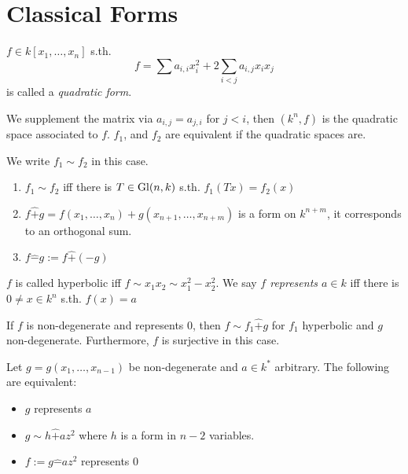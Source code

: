 \section{Classical Forms}
\begin{definition}
  $f\in k[x_1, \ldots, x_n]$ s.th.
  $$f = \sum a_{i,i}x_i^2 + 2\sum_{i<j}a_{i,j}x_ix_j$$
  is called a {\em quadratic form}.

  We supplement the matrix via $a_{i,j} = a_{j,i}$ for $j<i$, then
  $(k^n, f)$ is the quadratic space associated to $f$. $f_1$, and $f_2$
  are equivalent if the quadratic spaces are.

  We write $f_1\sim f_2$ in this case.
\end{definition}

\begin{remark}
   \begin{enumerate}
     \item $f_1 \sim f_2$ iff there is $T\in \mathop{\rm Gl}\nolimits(n, k)$ s.th. $f_1(T x) = f_2(x)$
     \item $f \hat + g = f(x_1, \ldots, x_n) + g(x_{n+1}, \ldots, x_{n+m})$ is
       a form on $k^{n+m}$, it corresponds to an orthogonal sum.
     \item $f \hat - g := f\hat +(-g)$
   \end{enumerate}
\end{remark}

\begin{definition}
  $f$ is called hyperbolic iff $f\sim x_1x_2 \sim x_1^2-x_2^2$.
  We say {\em $f$ represents $a\in k$} iff there is $0\ne x\in k^n$ s.th.
  $f(x) = a$
\end{definition}

\begin{proposition}
  If $f$ is non-degenerate and represents $0$, then $f\sim f_1 \hat + g$
  for $f_1$ hyperbolic and $g$ non-degenerate. Furthermore, $f$ is surjective
  in this case.
\end{proposition}

\begin{korollar}
  Let $g = g(x_1, \ldots, x_{n-1})$ be non-degenerate and $a\in k^*$ arbitrary.
  The following are equivalent:
  \begin{itemize}
    \item $g$ represents $a$
    \item $g\sim h \hat + az^2$ where $h$ is a form in $n-2$ variables.
    \item $f := g\hat - az^2$ represents $0$
  \end{itemize}
\end{korollar}


